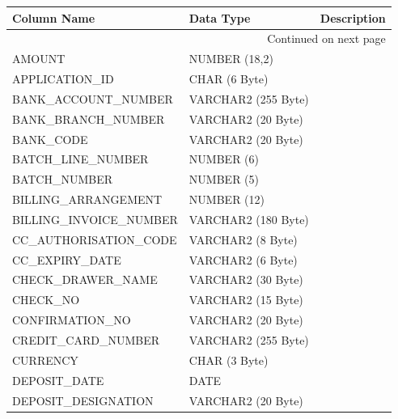 \documentclass[12pt,twoside]{article}
\begin{document}
\scriptsize
\begin{longtable}{lll}

\hline
 \textbf{Column Name}           &  \textbf{Data Type}   &  \textbf{Description} \\
\hline
\endhead
\hline\multicolumn{3}{r}{Continued on next page}\
\endfoot
\endlastfoot
 ACCOUNT\_ID                    &  NUMBER (12)          &                        \\
 AMOUNT                         &  NUMBER (18,2)        &                        \\
 APPLICATION\_ID                &  CHAR (6 Byte)        &                        \\
 BANK\_ACCOUNT\_NUMBER          &  VARCHAR2 (255 Byte)  &                        \\
 BANK\_BRANCH\_NUMBER           &  VARCHAR2 (20 Byte)   &                        \\
 BANK\_CODE                     &  VARCHAR2 (20 Byte)   &                        \\
 BATCH\_LINE\_NUMBER            &  NUMBER (6)           &                        \\
 BATCH\_NUMBER                  &  NUMBER (5)           &                        \\
 BILLING\_ARRANGEMENT           &  NUMBER (12)          &                        \\
 BILLING\_INVOICE\_NUMBER       &  VARCHAR2 (180 Byte)  &                        \\
 CC\_AUTHORISATION\_CODE        &  VARCHAR2 (8 Byte)    &                        \\
 CC\_EXPIRY\_DATE               &  VARCHAR2 (6 Byte)    &                        \\
 CHECK\_DRAWER\_NAME            &  VARCHAR2 (30 Byte)   &                        \\
 CHECK\_NO                      &  VARCHAR2 (15 Byte)   &                        \\
 CONFIRMATION\_NO               &  VARCHAR2 (20 Byte)   &                        \\
 CREDIT\_CARD\_NUMBER           &  VARCHAR2 (255 Byte)  &                        \\
 CURRENCY                       &  CHAR (3 Byte)        &                        \\
 DEPOSIT\_DATE                  &  DATE                 &                        \\
 DEPOSIT\_DESIGNATION           &  VARCHAR2 (20 Byte)   &                        \\

\end{longtable}
\end{document}
